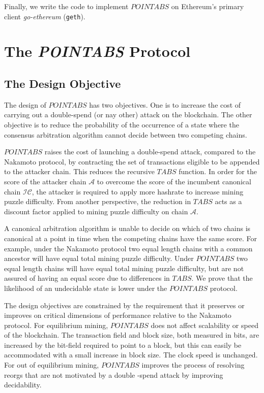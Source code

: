 \documentclass[11pt]{article}
\theoremstyle{plain}
\begin{document}
Finally, we write the code to implement $POINTABS$ on Ethereum's primary client \textit{go-ethereum} (\texttt{geth}).


\section{\normalsize{The \textit{POINTABS} Protocol}}

\subsection{\small{The Design Objective}}

The design of $POINTABS$ has two objectives. One is to increase the cost of carrying out a double-spend (or nay other) attack on the blockchain. The other objective is to reduce the probability of the occurrence of a state where the consensus arbitration algorithm cannot decide between two competing chains.

$POINTABS$ raises the cost of launching a double-spend attack, compared to the Nakamoto protocol, by contracting the set of transactions eligible to be appended to the attacker chain. This reduces the recursive $TABS$ function. In order for the score of the attacker chain $\mathcal{A}$ to overcome the score of the incumbent canonical chain $\mathcal{IC}$, the attacker is required to apply more hashrate to increase mining puzzle difficulty. From another perspective, the reduction in $TABS$ acts as a discount factor applied to mining puzzle difficulty on chain $\mathcal{A}$.

A canonical arbitration algorithm is unable to decide on which of two chains is canonical at a point in time when the competing chains have the same score. For example, under the Nakamoto protocol two equal length chains with a common ancestor will have equal total mining puzzle difficulty. Under $POINTABS$ two equal length chains will have equal total mining puzzle difficulty, but are not assured of having an equal score due to differences in $TABS$. We prove that the likelihood of an undecidable state is lower under the $POINTABS$ protocol.

The design objectives are constrained by the requirement that it preserves or improves on critical dimensions of performance relative to the Nakamoto protocol. For equilibrium mining, $POINTABS$ does not affect scalability or speed of the blockchain. The transaction field and block size, both measured in bits, are increased by the bit-field required to point to a block, but this can easily be accommodated with a small increase in block size. The clock speed is unchanged. For out of equilibrium mining, $POINTABS$ improves the process of resolving reorgs that are not motivated by a double -spend attack by improving decidability.
\end{document}
